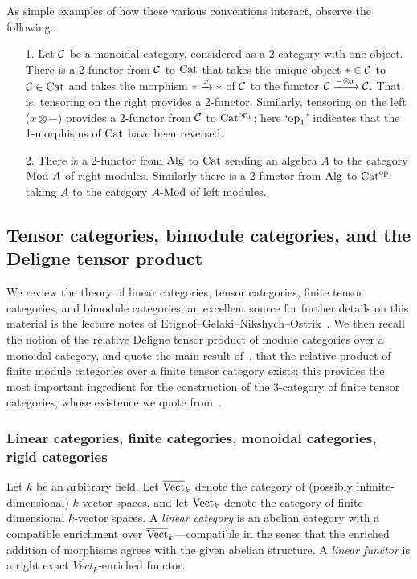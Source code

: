 \documentclass{amsart}
\begin{document}
As simple examples of how these various conventions interact, observe the following:
\begin{itemize}
\item[1.] Let $\mathcal C$ be a monoidal category, considered as a 2-category with one object.  There is a 2-functor from $\mathcal C$ to $\mathrm{Cat}$ that takes the unique object $\ast \in \mathcal C$ to $\mathcal C \in \mathrm{Cat}$ and takes the morphism $\ast \xrightarrow{x} \ast$ of $\mathcal C$ to the functor $\mathcal C \xrightarrow{- \otimes x} \mathcal C$.  That is, tensoring on the right provides a 2-functor.  Similarly, tensoring on the left ($x \otimes -$) provides a 2-functor from $\mathcal C$ to $\mathrm{Cat}^{\mathrm{op}_1}$; here `$\mathrm{op}_1$' indicates that the 1-morphisms of $\mathrm{Cat}$ have been reversed.
\item[2.] There is a 2-functor from $\mathrm{Alg}$ to $\mathrm{Cat}$ sending an algebra $A$ to the category $\Mod{}{A}$ of right modules.  Similarly there is a 2-functor from $\mathrm{Alg}$ to $\mathrm{Cat}^{\mathrm{op}_1}$ taking $A$ to the category $\Mod{A}{}$ of left modules.
\end{itemize}


\subsection{Tensor categories, bimodule categories, and the Deligne tensor product} \label{sec:tc-lincat}


We review the theory of linear categories, tensor categories, finite tensor categories, and bimodule categories; an excellent source for further details on this material is the lecture notes of Etignof--Gelaki--Nikshych--Ostrik~\cite{EGNO}.  We then recall the notion of the relative Deligne tensor product of module categories over a monoidal category, and quote the main result of~\cite{BTP}, that the relative product of finite module categories over a finite tensor category exists; this provides the most important ingredient for the construction of the 3-category of finite tensor categories, whose existence we quote from~\cite{3TC}.

\subsubsection{Linear categories, finite categories, monoidal categories, rigid categories}

Let $k$ be an arbitrary field.  Let $\overline{\mathrm{Vect}}_k$ denote the category of (possibly infinite-dimensional) $k$-vector spaces, and let $\mathrm{Vect}_k$ denote the category of finite-dimensional $k$-vector spaces.  A \emph{linear category} is an abelian category with a compatible enrichment over $\overline{\mathrm{Vect}}_k$---compatible in the sense that the enriched addition of morphisms agrees with the given abelian structure.  A \emph{linear functor} is a right exact $\overline{Vect}_k$-enriched functor. 
\end{document}
